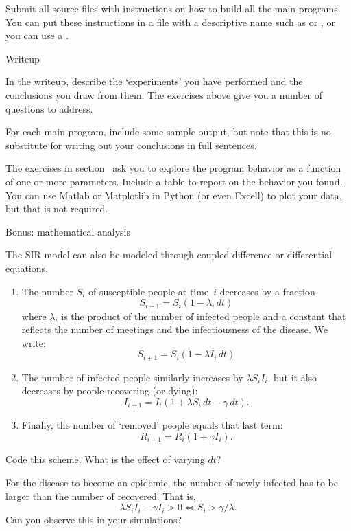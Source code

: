 Submit all source files with instructions on how to build all the main
programs. You can put these instructions in a file with a descriptive
name such as  or , or you can use a
.

 {Writeup}

In the writeup, describe the `experiments' you have performed and the
conclusions you draw from them. The exercises above give you a number
of questions to address.

For each main program, include some sample output, but note that this
is no substitute for writing out your conclusions in full sentences.

The exercises in section~
ask you to explore the program behavior as a
function of one or more parameters. Include a table to report on the
behavior you found. You can use Matlab or Matplotlib in Python (or
even Excell) to plot your data, but that is not required.

 {Bonus: mathematical analysis}

The SIR model can also be modeled through coupled difference or differential
equations. 
\begin{enumerate}
\item The number $S_i$ of susceptible people at time~$i$ decreases by a fraction
  \[ S_{i+1} = S_i(1-\lambda_i\,dt)\]
  where $\lambda_i$ is the product of the number of infected people
  and a constant that reflects the number of meetings and the infectiousness
  of the disease. We write:
  \[ S_{i+1} = S_i(1-\lambda I_i\,dt)\]
\item The number of infected people similarly increases by $\lambda S_iI_i$,
  but it also decreases by people recovering (or dying):
  \[ I_{i+1} = I_i(1+\lambda S_i\,dt-\gamma\,dt). \]
\item Finally, the number of `removed' people equals that last term:
  \[ R_{i+1} = R_i(1+\gamma I_i). \]
\end{enumerate}

\begin{exercise}
  Code this scheme. What is the effect of varying $dt$?
\end{exercise}

\begin{exercise}
  For the disease to become an epidemic, the number of newly infected
  has to be larger than the number of recovered. That is,
  \[ \lambda S_iI_i - \gamma I_i>0 \Leftrightarrow S_i>\gamma/\lambda. \]
  Can you observe this in your simulations?
\end{exercise}

